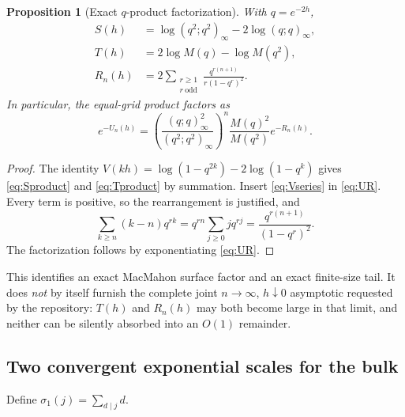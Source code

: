 \documentclass[11pt,a4paper]{article}
\newtheorem{proposition}[theorem]{Proposition}
\theoremstyle{definition}
\theoremstyle{remark}
\begin{document}
\begin{proposition}[Exact $q$-product factorization]
\label{prop:qproducts}
With $q=e^{-2h}$,
\begin{align}
 S(h)&=\log(q^2;q^2)_\infty-2\log(q;q)_\infty,
 \label{eq:Sproduct}\\
 T(h)&=2\log M(q)-\log M(q^2),
 \label{eq:Tproduct}\\
 R_n(h)&=2\sum_{\substack{r\ge1\\r\ \mathrm{odd}}}
 \frac{q^{r(n+1)}}{r(1-q^r)^2}.
 \label{eq:Rproduct}
\end{align}
In particular, the equal-grid product factors as
\begin{equation}
 e^{-U_n(h)}
 =\left(\frac{(q;q)_\infty^2}{(q^2;q^2)_\infty}\right)^n
 \frac{M(q)^2}{M(q^2)}e^{-R_n(h)}.
 \label{eq:finiteproductexact}
\end{equation}
\end{proposition}
\begin{proof}
The identity
$V(kh)=\log(1-q^{2k})-2\log(1-q^k)$ gives
\eqref{eq:Sproduct} and \eqref{eq:Tproduct} by summation. Insert
\eqref{eq:Vseries} in \eqref{eq:UR}. Every term is positive, so the
rearrangement is justified, and
\[
 \sum_{k\ge n}(k-n)q^{rk}
 =q^{rn}\sum_{j\ge0}j q^{rj}
 =\frac{q^{r(n+1)}}{(1-q^r)^2}.
\]
The factorization follows by exponentiating \eqref{eq:UR}.
\end{proof}

This identifies an exact MacMahon surface factor and an exact finite-size
tail. It does \emph{not} by itself furnish the complete joint
$n\to\infty$, $h\downarrow0$ asymptotic requested by the repository:
$T(h)$ and $R_n(h)$ may both become large in that limit, and neither can
be silently absorbed into an $O(1)$ remainder.

\subsection{Two convergent exponential scales for the bulk}
Define $\sigma_1(j)=\sum_{d\mid j}d$.
\end{document}
